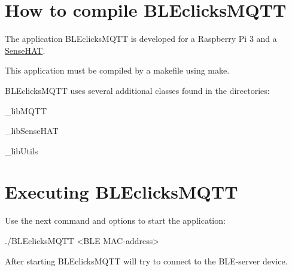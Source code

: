 \hypertarget{index_sec1}{}\section{How to compile B\+L\+Eclicks\+M\+Q\+TT}\label{index_sec1}
The application B\+L\+Eclicks\+M\+Q\+TT is developed for a Raspberry Pi 3 and a \hyperlink{class_sense_h_a_t}{Sense\+H\+AT}.

This application must be compiled by a makefile using make.

B\+L\+Eclicks\+M\+Q\+TT uses several additional classes found in the directories\+:
\begin{DoxyItemize}
\item \+\_\+lib\+M\+Q\+TT
\item \+\_\+lib\+Sense\+H\+AT
\item \+\_\+lib\+Utils
\end{DoxyItemize}\hypertarget{index_sec2}{}\section{Executing B\+L\+Eclicks\+M\+Q\+TT}\label{index_sec2}
Use the next command and options to start the application\+:

\begin{DoxyVerb}./BLEclicksMQTT <BLE MAC-address> \end{DoxyVerb}


After starting B\+L\+Eclicks\+M\+Q\+TT will try to connect to the B\+L\+E-\/server device. 